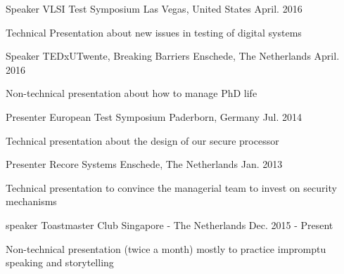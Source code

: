 

\begin{cventries}

  \cventry
    {Speaker} %
    { VLSI Test Symposium} %
    {Las Vegas, United States} %
    {April. 2016} %
    {
      \begin{cvitems} %
        \item {Technical Presentation about new issues in testing of digital systems}
      \end{cvitems}
    }

  \cventry
    {Speaker} %
    {TEDxUTwente, Breaking Barriers} %
    {Enschede, The Netherlands} %
    {April. 2016} %
    {
      \begin{cvitems} %
        \item {Non-technical presentation about how to manage PhD life}
      \end{cvitems}
    }

  \cventry
    {Presenter} %
    {European Test Symposium} %
    {Paderborn, Germany} %
    {Jul. 2014} %
    {
      \begin{cvitems} %
        \item {Technical presentation about the design of our secure processor}
      \end{cvitems}
    }

  \cventry
    {Presenter} %
    {Recore Systems} %
    {Enschede, The Netherlands} %
    {Jan. 2013} %
    {
      \begin{cvitems} %
        \item {Technical presentation to convince the managerial team to invest on security mechanisms}
      \end{cvitems}
    }

  \cventry
    {speaker} %
    {Toastmaster Club} %
    {Singapore - The Netherlands} %
    {Dec. 2015 - Present} %
    {
      \begin{cvitems} %
        \item {Non-technical presentation (twice a month) mostly to practice impromptu speaking and storytelling}
      \end{cvitems}
    }

\end{cventries}
